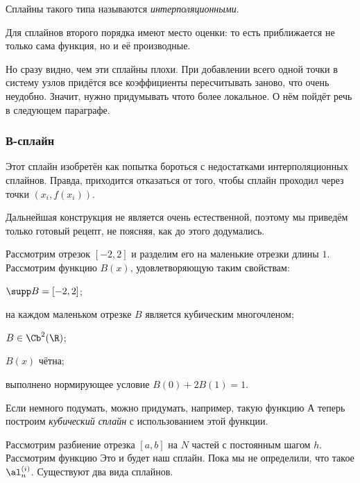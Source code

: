 \documentclass[a4paper]{article}
\begin{document}
\begin{df}
Сплайны такого типа называются \emph{интерполяционными}.
\end{df}

Для сплайнов второго порядка имеют место оценки:
то есть приближается не только сама функция, но и её производные.

Но сразу видно, чем эти сплайны плохи. При добавлении всего одной точки в систему узлов
придётся все коэффициенты пересчитывать заново, что очень неудобно.
Значит, нужно придумывать что\д то более локальное. О нём пойдёт речь в следующем параграфе.

\subsubsection{В-сплайн}

Этот сплайн изобретён как попытка бороться с недостатками интерполяционных сплайнов.
Правда, приходится отказаться от того, чтобы сплайн проходил через точки $(x_i, f(x_i))$.

Дальнейшая конструкция не является очень естественной, поэтому мы приведём только
готовый рецепт, не поясняя, как до этого додумались.

Рассмотрим отрезок $[-2,2]$ и разделим его на маленькие отрезки длины $1$.
Рассмотрим функцию $B(x)$, удовлетворяющую таким свойствам:
\begin{items}{-2}
\item $\supp B = [-2,2]$;
\item на каждом маленьком отрезке $B$ является кубическим многочленом;
\item $B \in \Cb^2(\R)$;
\item $B(x)$ чётна;
\item выполнено нормирующее условие $B(0) + 2B(1) = 1$.
\end{items}
Если немного подумать, можно придумать, например, такую функцию
А теперь построим \emph{кубический сплайн} с использованием этой функции.

Рассмотрим разбиение отрезка $[a,b]$ на $N$ частей с постоянным шагом $h$.
Рассмотрим функцию
Это и будет наш сплайн. Пока мы не определили, что такое $\al_n^{(i)}$.
Существуют два вида сплайнов.
\end{document}
